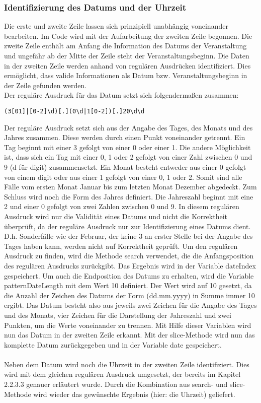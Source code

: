 {\subsubsection{Identifizierung des Datums und der Uhrzeit}
Die erste und zweite Zeile lassen sich prinzipiell unabhängig voneinander bearbeiten. Im Code wird mit der Aufarbeitung der zweiten Zeile begonnen. Die zweite Zeile enthält am Anfang die Information des Datums der Veranstaltung und ungefähr ab der Mitte der Zeile steht der Veranstaltungsbeginn. Die Daten in der zweiten Zeile werden anhand von regulären Ausdrücken identifiziert. Dies ermöglicht, dass valide Informationen als Datum bzw. Veranstaltungsbeginn in der Zeile gefunden werden.\\
Der reguläre Ausdruck für das Datum setzt sich folgendermaßen zusammen:
\begin{verbatim}
(3[01]|[0-2]\d)[.](0\d|1[0-2])[.]20\d\d
\end{verbatim}
Der reguläre Ausdruck setzt sich aus der Angabe des Tages, des Monats und des Jahres zusammen. Diese werden durch einen Punkt voneinander getrennt. Ein Tag beginnt mit einer 3 gefolgt von einer 0 oder einer 1. Die andere Möglichkeit ist, dass sich ein Tag mit einer 0, 1 oder 2 gefolgt von einer Zahl zwischen 0 und 9 (d für digit) zusammensetzt. Ein Monat besteht entweder aus einer 0 gefolgt von einem digit oder aus einer 1 gefolgt von einer 0, 1 oder 2. Somit sind alle Fälle vom ersten Monat Januar bis zum letzten Monat Dezember abgedeckt. Zum Schluss wird noch die Form des Jahres definiert. Die Jahreszahl beginnt mit eine 2 und einer 0 gefolgt von zwei Zahlen zwischen 0 und 9. 
In diesem regulären Ausdruck wird nur die Validität eines Datums und nicht die Korrektheit überprüft, da der reguläre Ausdruck nur zur Identifizierung eines Datums dient. D.h. Sonderfälle wie der Februar, der keine 3 an erster Stelle bei der Angabe des Tages haben kann, werden nicht auf Korrektheit geprüft.
Um den regulären Ausdruck zu finden, wird die Methode search verwendet, die die Anfangsposition des regulären Ausdrucks zurückgibt. Das Ergebnis wird in der Variable dateIndex gespeichert. Um auch die Endposition des Datums zu erhalten, wird die Variable patternDateLength mit dem Wert 10 definiert. Der Wert wird auf 10 gesetzt, da die Anzahl der Zeichen des Datums der Form (dd.mm.yyyy) in Summe immer 10 ergibt. Das Datum besteht also aus jeweils zwei Zeichen für die Angabe des Tages und des Monats, vier Zeichen für die Darstellung der Jahreszahl und zwei Punkten, um die Werte voneinander zu trennen. Mit Hilfe dieser Variablen wird nun das Datum in der zweiten Zeile erkannt. Mit der slice-Methode wird nun das komplette Datum zurückgegeben und in der Variable date gespeichert.\\
\\
Neben dem Datum wird noch die Uhrzeit in der zweiten Zeile identifiziert. Dies wird mit dem gleichen regulären Ausdruck umgesetzt, der bereits im Kapitel 2.2.3.3 genauer erläutert wurde. Durch die Kombination aus search- und slice-Methode wird wieder das gewünschte Ergebnis (hier: die Uhrzeit) geliefert. 

}
